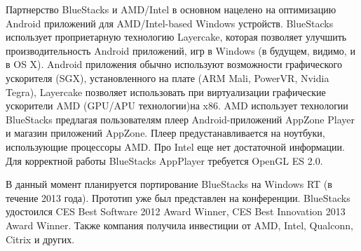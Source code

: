 Партнерство BlueStacks и AMD/Intel в основном нацелено на оптимизацию Android приложений для AMD/Intel-based Windows устройств. BlueStacks использует проприетарную технологию Layercake, которая позволяет улучшить производительность Android приложений, игр в Windows (в будущем, видимо, и в OS X). Android приложения обычно используют возможности графического ускорителя (SGX), установленного на плате (ARM Mali, PowerVR, Nvidia Tegra), Layercake позволяет использовать при виртуализации графические ускорители AMD (GPU/APU технологии)на x86. AMD использует технологии BlueStacks предлагая пользователям плеер Android-приложений AppZone Player и магазин приложений AppZone. Плеер предустанавливается на ноутбуки, использующие процессоры AMD. Про Intel еще нет достаточной информации. Для корректной работы BlueStacks AppPlayer требуется OpenGL ES 2.0.

В данный момент планируется портирование BlueStacks на Windows RT (в течение 2013 года). Прототип уже был представлен на конференции. BlueStacks удостоился CES Best Software 2012 Award Winner, CES Best Innovation 2013 Award Winner. Также компания получила инвестиции от AMD, Intel, Qualconn, Citrix и других.




